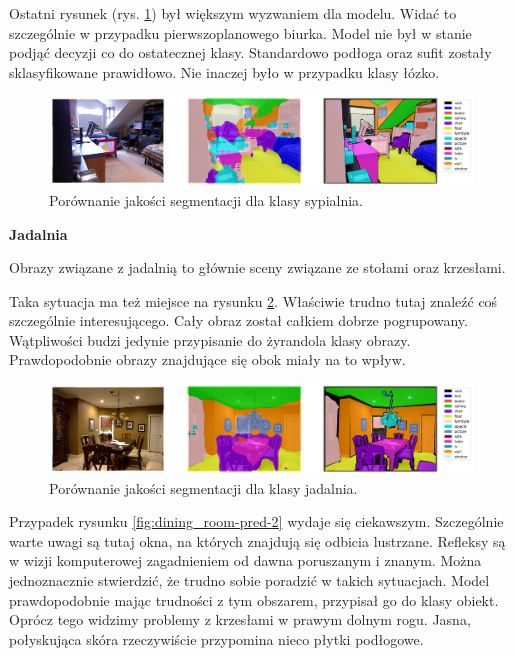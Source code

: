 Ostatni rysunek (rys. \ref{fig:bedroom-pred-3}) był większym wyzwaniem dla modelu. Widać to szczególnie w przypadku pierwszoplanowego biurka. Model nie był w stanie podjąć decyzji co do ostatecznej klasy. Standardowo podłoga oraz sufit zostały sklasyfikowane prawidłowo. Nie inaczej było w przypadku klasy łózko.
\begin{figure}[ht!]
    \centering
    \includegraphics[width=\textwidth]{img/preds_analysis/gt_vs_pred/bedroom-3.png}
    \caption{Porównanie jakości segmentacji dla klasy sypialnia.}
    \label{fig:bedroom-pred-3}
\end{figure}

\noindent
\textbf{Jadalnia}


Obrazy związane z jadalnią to głównie sceny związane ze stołami oraz krzesłami.

Taka sytuacja ma też miejsce na rysunku \ref{fig:dining_room-pred-1}. Właściwie trudno tutaj znaleźć coś szczególnie interesującego. Cały obraz został całkiem dobrze pogrupowany. Wątpliwości budzi jedynie przypisanie do żyrandola klasy obrazy. Prawdopodobnie obrazy znajdujące się obok miały na to wpływ.


\begin{figure}[ht!]
    \centering
    \includegraphics[width=\textwidth]{img/preds_analysis/gt_vs_pred/dining_room-1.png}
    \caption{Porównanie jakości segmentacji dla klasy jadalnia.}
    \label{fig:dining_room-pred-1}
\end{figure}

Przypadek rysunku \ref{fig:dining_room-pred-2} wydaje się ciekawszym. Szczególnie warte uwagi są tutaj okna, na których znajdują się odbicia lustrzane. Refleksy są w wizji komputerowej zagadnieniem od dawna poruszanym i znanym. Można jednoznacznie stwierdzić, że trudno sobie poradzić w takich sytuacjach. Model prawdopodobnie mając trudności z tym obszarem, przypisał go do klasy obiekt. Oprócz tego widzimy problemy z krzesłami w prawym dolnym rogu. Jasna, połyskująca skóra rzeczywiście przypomina nieco płytki podłogowe.

